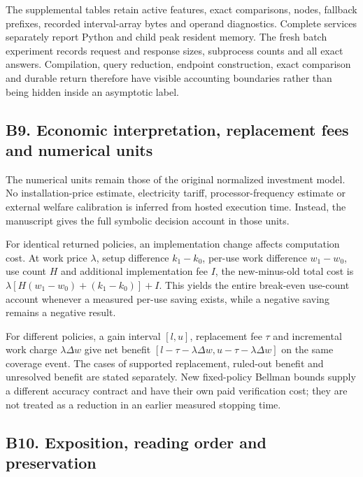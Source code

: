 The supplemental tables retain active features, exact comparisons,
nodes, fallback prefixes, recorded interval-array bytes and operand
diagnostics. Complete services separately report Python and child peak
resident memory. The fresh batch experiment records request and response
sizes, subprocess counts and all exact answers. Compilation, query
reduction, endpoint construction, exact comparison and durable return
therefore have visible accounting boundaries rather than being hidden
inside an asymptotic label.

\hypertarget{b9.-economic-interpretation-replacement-fees-and-numerical-units}{%
\subsection{B9. Economic interpretation, replacement fees and numerical
units}\label{b9.-economic-interpretation-replacement-fees-and-numerical-units}}

The numerical units remain those of the original normalized investment
model. No installation-price estimate, electricity tariff,
processor-frequency estimate or external welfare calibration is inferred
from hosted execution time. Instead, the manuscript gives the full
symbolic decision account in those units.

For identical returned policies, an implementation change affects
computation cost. At work price \(\lambda\), setup difference
\(k_1-k_0\), per-use work difference \(w_1-w_0\), use count \(H\) and
additional implementation fee \(I\), the new-minus-old total cost is
\(\lambda[H(w_1-w_0)+(k_1-k_0)]+I\). This yields the entire break-even
use-count account whenever a measured per-use saving exists, while a
negative saving remains a negative result.

For different policies, a gain interval \([l,u]\), replacement fee
\(\tau\) and incremental work charge \(\lambda\Delta w\) give net
benefit \([l-\tau-\lambda\Delta w,u-\tau-\lambda\Delta w]\) on the same
coverage event. The cases of supported replacement, ruled-out benefit
and unresolved benefit are stated separately. New fixed-policy Bellman
bounds supply a different accuracy contract and have their own paid
verification cost; they are not treated as a reduction in an earlier
measured stopping time.

\hypertarget{b10.-exposition-reading-order-and-preservation}{%
\subsection{B10. Exposition, reading order and
preservation}\label{b10.-exposition-reading-order-and-preservation}}

